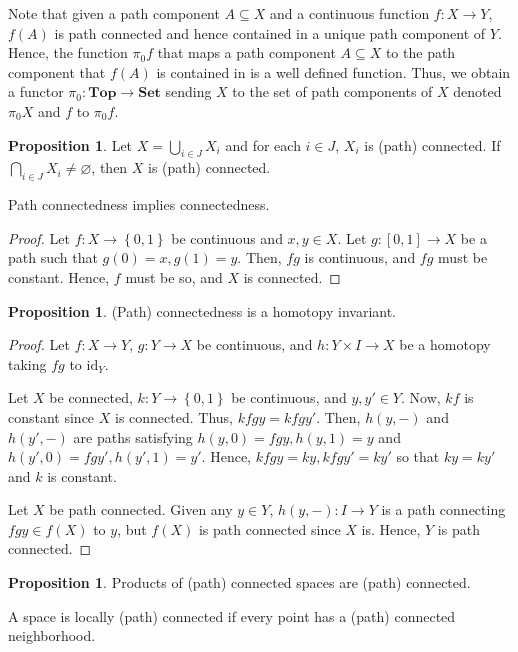 \documentclass[12pt,reqno]{amsart}
\numberwithin{theorem}{section}
\theoremstyle{definition}
\theoremstyle{remark}
\numberwithin{equation}{section}
\newcommand{\set}[1]{\left \{ #1 \right \}}
\theoremstyle{definition}
\newtheorem{prop}[theorem]{Proposition}
\newcommand{\id}{\mathrm{id}}
\begin{document}
Note that given a path component $A \subseteq X$ and a continuous function $f:X\rightarrow Y$, $f(A)$ is path connected and hence contained in a unique path component of $Y$. Hence, the function $\pi_0f$ that maps a path component $A\subseteq X$ to the path component that $f(A)$ is contained in is a well defined function. Thus, we obtain a functor $\pi_0:\mathbf{Top}\rightarrow\mathbf{Set}$ sending $X$ to the set of path components of $X$ denoted $\pi_0X$ and $f$ to $\pi_0f$.
\begin{prop}
    Let $X = \bigcup_{i \in J}X_i$ and for each $i \in J$, $X_i$ is (path) connected. If $\bigcap_{i \in J}X_i \neq \varnothing$, then $X$ is (path) connected.
\end{prop}
\begin{theorem}
    Path connectedness implies connectedness.
\end{theorem}
\begin{proof}
    Let $f:X\rightarrow \set {0,1}$ be continuous and $x,y \in X$. Let $g:[0,1]\rightarrow X$ be a path such that $g(0)=x,g(1)=y$. Then, $fg$ is continuous, and $fg$ must be constant. Hence, $f$ must be so, and $X$ is connected.
\end{proof}
\begin{prop}
    (Path) connectedness is a homotopy invariant.
\end{prop}
\begin{proof}
    Let $f:X\rightarrow Y$, $g:Y\rightarrow X$ be continuous, and $h:Y\times I \rightarrow X$ be a homotopy taking $fg$ to $\id_Y$.
    
    Let $X$ be connected, $k:Y\rightarrow \set{0,1}$ be continuous, and $y,y' \in Y$. Now, $kf$ is constant since $X$ is connected. Thus, $kfgy = kfgy'$. Then, $h(y,-)$ and $h(y',-)$ are paths satisfying $h(y,0)=fgy,h(y,1)=y$ and $h(y',0)=fgy',h(y',1)=y'$. Hence, $kfgy=ky,kfgy'=ky'$ so that $ky=ky'$ and $k$ is constant.

    Let $X$ be path connected. Given any $y \in Y$, $h(y,-):I\rightarrow Y$ is a path connecting $fgy \in f(X)$ to $y$, but $f(X)$ is path connected since $X$ is. Hence, $Y$ is path connected.
\end{proof}
\begin{prop}
    Products of (path) connected spaces are (path) connected.
\end{prop}
\begin{definition}
    A space is locally (path) connected if every point has a (path) connected neighborhood.
\end{definition}
\end{document}
